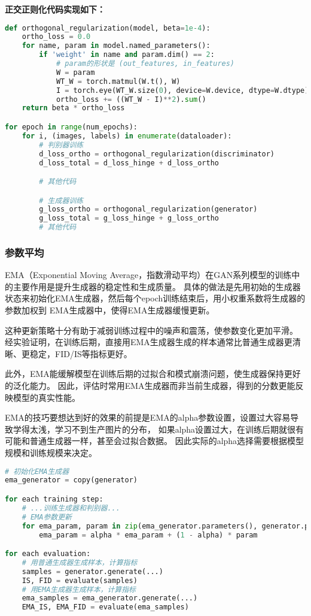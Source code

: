 \documentclass[12pt, a4paper]{article}
\begin{document}
\noindent\textbf{正交正则化代码实现如下：}
\begin{lstlisting}[language=Python]
def orthogonal_regularization(model, beta=1e-4):
    ortho_loss = 0.0
    for name, param in model.named_parameters():
        if 'weight' in name and param.dim() == 2:
            # param的形状是 (out_features, in_features)
            W = param
            WT_W = torch.matmul(W.t(), W)
            I = torch.eye(WT_W.size(0), device=W.device, dtype=W.dtype)
            ortho_loss += ((WT_W - I)**2).sum()
    return beta * ortho_loss

for epoch in range(num_epochs):
    for i, (images, labels) in enumerate(dataloader):
        # 判别器训练
        d_loss_ortho = orthogonal_regularization(discriminator)
        d_loss_total = d_loss_hinge + d_loss_ortho

        # 其他代码

        # 生成器训练
        g_loss_ortho = orthogonal_regularization(generator)
        g_loss_total = g_loss_hinge + g_loss_ortho
        # 其他代码
\end{lstlisting}  


\subsubsection{参数平均}
EMA（Exponential Moving Average，指数滑动平均）在GAN系列模型的训练中的主要作用是提升生成器的稳定性和生成质量。
具体的做法是先用初始的生成器状态来初始化EMA生成器，然后每个epoch训练结束后，用小权重系数将生成器的参数加权到
EMA生成器中，使得EMA生成器缓慢更新。

这种更新策略十分有助于减弱训练过程中的噪声和震荡，使参数变化更加平滑。
经实验证明，在训练后期，直接用EMA生成器生成的样本通常比普通生成器更清晰、更稳定，FID/IS等指标更好。

此外，EMA能缓解模型在训练后期的过拟合和模式崩溃问题，使生成器保持更好的泛化能力。
因此，评估时常用EMA生成器而非当前生成器，得到的分数更能反映模型的真实性能。

EMA的技巧要想达到好的效果的前提是EMA的alpha参数设置，设置过大容易导致学得太浅，学习不到生产图片的分布，
如果alpha设置过大，在训练后期就很有可能和普通生成器一样，甚至会过拟合数据。
因此实际的alpha选择需要根据模型规模和训练规模来决定。

\vspace{1cm}

\begin{lstlisting}[language=python]
# 初始化EMA生成器
ema_generator = copy(generator)

for each training step:
    # ...训练生成器和判别器...
    # EMA参数更新
    for ema_param, param in zip(ema_generator.parameters(), generator.parameters()):
        ema_param = alpha * ema_param + (1 - alpha) * param

for each evaluation:
    # 用普通生成器生成样本，计算指标
    samples = generator.generate(...)
    IS, FID = evaluate(samples)
    # 用EMA生成器生成样本，计算指标
    ema_samples = ema_generator.generate(...)
    EMA_IS, EMA_FID = evaluate(ema_samples)
\end{lstlisting}
\end{document}
